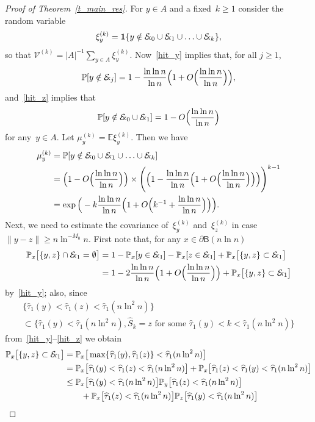 \documentclass[10pt]{amsart}
\theoremstyle{definition}\newtheorem{defi}[theo]{Definition}\newtheorem{rema}[theo]{Remark}\newtheorem{exam}[theo]{Example}\newtheorem{exem}[theo]{Example}\newtheorem{nota}[theo]{Notation}
\newcommand{\1}[1]{{\mathbf 1}{\{#1\}}}
\newcommand{\V}{{\mathcal V}}
\newcommand{\Ex}{{\mathcal{E}\!\!\text{\footnotesize{\textsl{x}}}}}
\newcommand{\s}{{\widehat S}}
\newcommand{\8}{{\infty}}
\newcommand{\IP}{{\mathbb P}}
\newcommand{\IE}{{\mathbb E}}
\newcommand{\htau}{\widehat{\tau}}
\newcommand{\B}{{\mathsf B}}
\begin{document}
\begin{proof}[Proof of Theorem~\ref{t_main_res}]
For $y\in A$ and a fixed~$k\geq 1$ consider the random variable
\[
\xi_y^{(k)} = \1{y\notin\Ex_0\cup \Ex_1\cup \ldots \cup \Ex_k},
\]
so that $\V^{(k)} = |A|^{-1}\sum_{y\in A}\xi_y^{(k)}$. Now~\eqref{hit_y} implies that, for all $j\geq 1$,
\[
\IP[y\notin \Ex_j] = 1-\frac{\ln\ln n}{\ln n}
\Big(1+O\Big(\frac{\ln\ln n}{\ln n}\Big)\Big),
\]
and~\eqref{hit_z} implies that
\[
\IP[y\notin \Ex_0\cup\Ex_1] = 1 - O\Big(\frac{\ln\ln n}{\ln n}\Big)
\]
for any~$y\in A$. Let $\mu_y^{(k)}=\IE \xi_y^{(k)}$. Then we have
\begin{align}
\mu_y^{(k)} &= \IP[y\notin\Ex_0\cup \Ex_1\cup \ldots \cup \Ex_k]
\nonumber\\
&= \Big(1-O\Big(\frac{\ln\ln n}{\ln n}\Big)\Big)
\times
\Bigg(\Big(1-\frac{\ln\ln n}{\ln n}
\Big(1+O\Big(\frac{\ln\ln n}{\ln n}\Big)\Big)\Big)
\Bigg)^{k-1}\nonumber\\
&= \exp\Big(-k\frac{\ln\ln n}{\ln n}
\Big(1+O\Big(k^{-1}+\frac{\ln\ln n}{\ln n}\Big)\Big)\Big).\label{est_mu_k}
\end{align}
Next, we need to estimate the covariance of~$\xi_y^{(k)}$ and~$\xi_z^{(k)}$ in case $\|y-z\|\geq n\ln^{-M_0}n$. First note that, for any $x\in \partial\B(n\ln n)$
\begin{align*}
\IP_x\big[\{y,z\}\cap \Ex_1 = \emptyset \big] &= 1-\IP_x[y\in\Ex_1] - \IP_x[z\in\Ex_1] + \IP_x\big[\{y,z\}\subset \Ex_1 \big]\\
&= 1- 2 \frac{\ln\ln n}{\ln n}
\Big(1+O\Big(\frac{\ln\ln n}{\ln n}\Big)\Big) + \IP_x\big[\{y,z\}\subset \Ex_1 \big]
\end{align*}
by~\eqref{hit_y}; also, since
\begin{multline*}
\big\{\htau_1(y)<\htau_1(z)<\htau_1(n\ln^2 n)\big\} \\
\subset
\big\{\htau_1(y)<\htau_1(n\ln^2 n),\s_k=z \text{ for some }
\htau_1(y)<k<\htau_1(n\ln^2 n)\big\}
\end{multline*}
from~\eqref{hit_y}--\eqref{hit_z} we obtain
\begin{align*}
\IP_x\big[\{y,z\}\subset \Ex_1 \big] &=
\IP_x\big[\max\{\htau_1(y),\htau_1(z)\}<\htau_1(n\ln^2 n)\big]
\\
&= \IP_x\big[\htau_1(y)<\htau_1(z)<\htau_1(n\ln^2 n)\big] + \IP_x\big[\htau_1(z)<\htau_1(y)<\htau_1(n\ln^2 n)\big]\\
&\leq \IP_x\big[\htau_1(y)<\htau_1(n\ln^2 n)\big]
\IP_y\big[\htau_1(z)<\htau_1(n\ln^2 n)\big]\\
& \qquad + \IP_x\big[\htau_1(z)<\htau_1(n\ln^2 n)\big]
\IP_z\big[\htau_1(y)<\htau_1(n\ln^2 n)\big]\\

\end{align*}
\end{proof}
\end{document}
